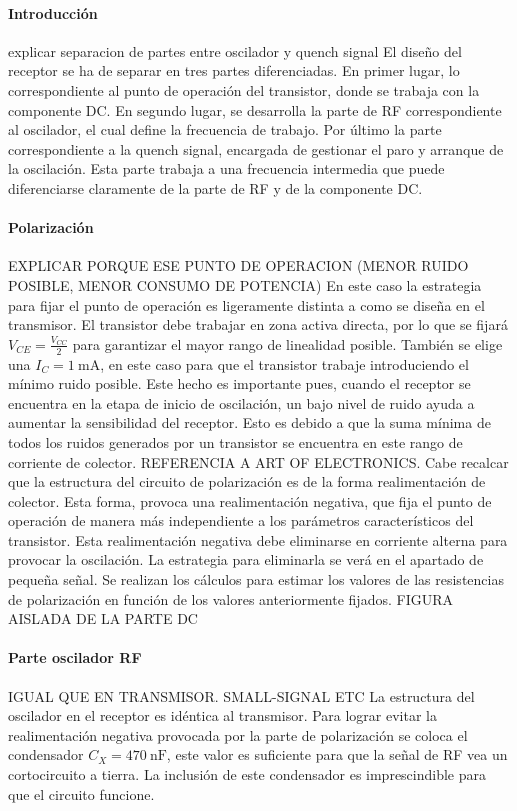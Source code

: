 \paragraph{Introducci\'on}
explicar separacion de partes entre oscilador y quench signal
El diseño del receptor se ha de separar en tres partes diferenciadas. En primer lugar, lo correspondiente al punto de operación del transistor, donde se trabaja con la componente DC. En segundo lugar, se desarrolla la parte de RF correspondiente al oscilador, el cual define la frecuencia de trabajo. Por último la parte correspondiente a la quench signal, encargada de gestionar el paro y arranque de la oscilación. Esta parte trabaja a una frecuencia intermedia que puede diferenciarse claramente de la parte de RF y de la componente DC.

\paragraph{Polarización} EXPLICAR PORQUE ESE PUNTO DE OPERACION (MENOR RUIDO POSIBLE, MENOR CONSUMO DE POTENCIA)
En este caso la estrategia para fijar el punto de operación es ligeramente distinta a como se diseña en el transmisor. El transistor debe trabajar en zona activa directa, por lo que se fijará $V_{CE} = \frac{V_{CC}}{2}$ para garantizar el mayor rango de linealidad posible. También se elige una $I_C = \SI{1}{\milli\ampere}$, en este caso para que el transistor trabaje introduciendo el mínimo ruido posible. Este hecho es importante pues, cuando el receptor se encuentra en la etapa de inicio de oscilación, un bajo nivel de ruido ayuda a aumentar la sensibilidad del receptor. Esto es debido a que la suma mínima de todos los ruidos generados por un transistor se encuentra en este rango de corriente de colector. REFERENCIA A ART OF ELECTRONICS.
Cabe recalcar que la estructura del circuito de polarización es de la forma realimentación de colector. Esta forma, provoca una realimentación negativa, que fija el punto de operación de manera más independiente a los parámetros característicos del transistor. Esta realimentación negativa debe eliminarse en corriente alterna para provocar la oscilación. La estrategia para eliminarla se verá en el apartado de pequeña señal.
Se realizan los cálculos para estimar los valores de las resistencias de polarización en función de los valores anteriormente fijados.
FIGURA AISLADA DE LA PARTE DC

\paragraph{Parte oscilador RF} IGUAL QUE EN TRANSMISOR. SMALL-SIGNAL ETC 
La estructura del oscilador en el receptor es idéntica al transmisor. Para lograr evitar la realimentación negativa provocada por la parte de polarización se coloca el condensador $C_X = \SI{470}{\nano\farad}$, este valor es suficiente para que la señal de RF vea un cortocircuito a tierra. La inclusión de este condensador es imprescindible para que el circuito funcione. 
